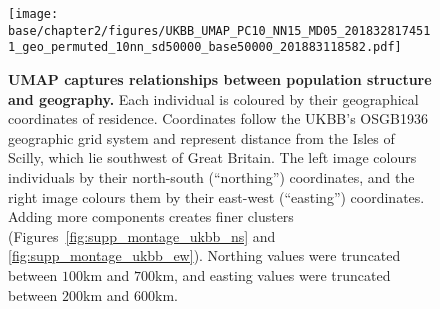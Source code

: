 \clearpage

\begin{figure}
    \centering
    \texttt{[image: base/chapter2/figures/UKBB\_UMAP\_PC10\_NN15\_MD05\_2018328174511\_geo\_permuted\_10nn\_sd50000\_base50000\_201883118582.pdf]}
      \caption[UMAP captures relationships between population structure and geography]{\textbf{UMAP captures relationships between population structure and geography.} Each individual is coloured by their geographical coordinates of residence. Coordinates follow the UKBB's OSGB1936 geographic grid system and represent distance from the Isles of Scilly, which lie southwest of Great Britain. The left image colours individuals by their north-south (``northing'') coordinates, and the right image colours them by their east-west (``easting'') coordinates. Adding more components creates finer clusters  (Figures~\ref{fig:supp_montage_ukbb_ns} and \ref{fig:supp_montage_ukbb_ew}). Northing values were truncated between $100$km and $700$km, and easting values were truncated between $200$km and $600$km.}
\label{fig:fig4}
\end{figure}

\clearpage

